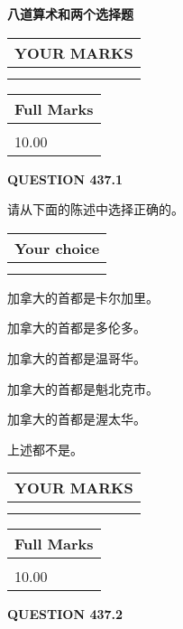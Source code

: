 \documentclass{ctexart}
\begin{document}
   
 \vspace{0.2in}
{\LARGE {\textbf{ 八道算术和两个选择题}}}
   
   
  
\vspace{0.2in}
  
\noindent\begin{tabular}{|l|}
\hline
 YOUR MARKS  \\
\hline
 \\ 
 \\ 
\hline
\end{tabular}
\hspace{0.05in} \begin{tabular}{|l|}
\hline
 Full Marks  \\
\hline
 \\ 
10.00 \\
\hline
\end{tabular}
{\textbf{\Large{QUESTION
437.1 
}}}
  
  
请从下面的陈述中选择正确的。
  
  
\noindent\hspace{3.0in} \begin{tabular}{|l|}
\hline
Your choice \\
\hline
 \\ 
 \\ 
\hline
\end{tabular}
  
  
 
 
加拿大的首都是卡尔加里。
 
 
加拿大的首都是多伦多。
 
 
加拿大的首都是温哥华。
 
 
加拿大的首都是魁北克市。
 
 
加拿大的首都是渥太华。
 
 
 上述都不是。
 
 
  
\vspace{0.2in}
  
\noindent\begin{tabular}{|l|}
\hline
 YOUR MARKS  \\
\hline
 \\ 
 \\ 
\hline
\end{tabular}
\hspace{0.05in} \begin{tabular}{|l|}
\hline
 Full Marks  \\
\hline
 \\ 
10.00 \\
\hline
\end{tabular}
{\textbf{\Large{QUESTION
437.2 
}}}
  
\end{document}
